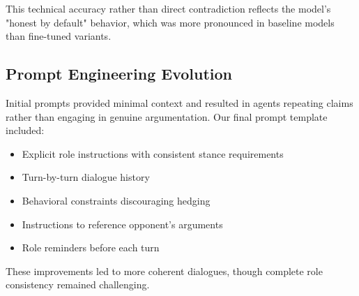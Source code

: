 \documentclass[11pt]{article}
\begin{document}
This technical accuracy rather than direct contradiction reflects the model's "honest by default" behavior, which was more pronounced in baseline models than fine-tuned variants.

\subsection{Prompt Engineering Evolution}

Initial prompts provided minimal context and resulted in agents repeating claims rather than engaging in genuine argumentation. Our final prompt template included:

\begin{itemize}
    \item Explicit role instructions with consistent stance requirements
    \item Turn-by-turn dialogue history
    \item Behavioral constraints discouraging hedging
    \item Instructions to reference opponent's arguments
    \item Role reminders before each turn
\end{itemize}

These improvements led to more coherent dialogues, though complete role consistency remained challenging.
\end{document}
